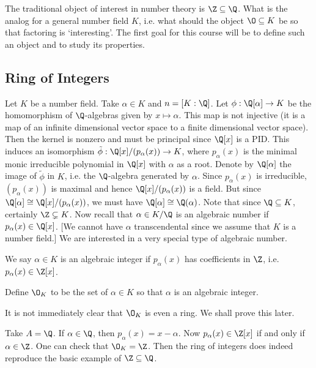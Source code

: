 The traditional object of interest in number theory is $\Z \subseteq \Q$. What is the analog for a general number field $K$, i.e. what should the object $\O \subseteq K$ be so that factoring is `interesting'. The first goal for this course will be to define such an object and to study its properties. 



\subsection{Ring of Integers}



Let $K$ be a number field. Take $\alpha \in K$ and $n=[K:\Q]$. Let $\phi: \Q[\alpha] \to K$ be the homomorphism of $\Q$-algebras given by $x \mapsto \alpha$. This map is not injective (it is a map of an infinite dimensional vector space to a finite dimensional vector space). Then the kernel is nonzero and must be principal since $\Q[x]$ is a PID. This induces an isomorphism $\tilde{\phi}: \Q[x]/(p_\alpha(x)) \to K$, where $p_\alpha(x)$ is the minimal monic irreducible polynomial in $\Q[x]$ with $\alpha$ as a root. Denote by $\Q[\alpha]$ the image of $\tilde{\phi}$ in $K$, i.e. the $\Q$-algebra generated by $\alpha$. Since $p_\alpha(x)$ is irreducible, $(p_\alpha(x))$ is maximal and hence $\Q[x]/(p_\alpha(x))$ is a field. But since $\Q[\alpha] \cong \Q[x]/(p_\alpha(x))$, we must have $\Q[\alpha] \cong \Q(\alpha)$. Note that since $\Q \subseteq K$, certainly $\Z \subsetneq K$. Now recall that $\alpha \in K/\Q$ is an algebraic number if $p_\alpha(x) \in \Q[x]$. [We cannot have $\alpha$ transcendental since we assume that $K$ is a number field.] We are interested in a very special type of algebraic number. 


\begin{dfn}
We say $\alpha \in K$ is an algebraic integer if $p_\alpha(x)$ has coefficients in $\Z$, i.e. $p_\alpha(x) \in \Z[x]$. 
\end{dfn}

\begin{dfn}
Define $\O_K$ to be the set of $\alpha \in K$ so that $\alpha$ is an algebraic integer.
\end{dfn}


It is not immediately clear that $\O_K$ is even a ring. We shall prove this later. 


\begin{ex}\label{ex:zinq}
Take $A=\Q$. If $\alpha \in \Q$, then $p_\alpha(x)= x - \alpha$. Now $p_\alpha(x) \in \Z[x]$ if and only if $\alpha \in \Z$. One can check that $\O_K=\Z$. Then the ring of integers does indeed reproduce the basic example of $\Z \subseteq \Q$. \xqed
\end{ex}


